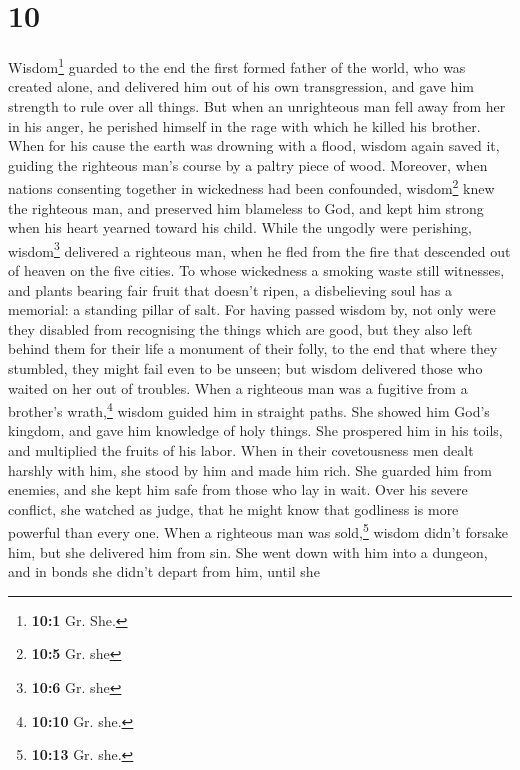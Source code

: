 \hypertarget{section-9}{%
\section{10}\label{section-9}}

 Wisdom\footnote{\textbf{10:1} Gr. She.} guarded to the
end the first formed father of the world, who was created alone, and
delivered him out of his own transgression,  and gave him
strength to rule over all things.  But when an unrighteous
man fell away from her in his anger, he perished himself in the rage
with which he killed his brother.  When for his cause the
earth was drowning with a flood, wisdom again saved it, guiding the
righteous man's course by a paltry piece of wood. 
Moreover, when nations consenting together in wickedness had been
confounded, wisdom\footnote{\textbf{10:5} Gr. she} knew the righteous
man, and preserved him blameless to God, and kept him strong when his
heart yearned toward his child.  While the ungodly were
perishing, wisdom\footnote{\textbf{10:6} Gr. she} delivered a righteous
man, when he fled from the fire that descended out of heaven on the five
cities.  To whose wickedness a smoking waste still
witnesses, and plants bearing fair fruit that doesn't ripen, a
disbelieving soul has a memorial: a standing pillar of salt.
 For having passed wisdom by, not only were they disabled
from recognising the things which are good, but they also left behind
them for their life a monument of their folly, to the end that where
they stumbled, they might fail even to be unseen;  but
wisdom delivered those who waited on her out of troubles.
 When a righteous man was a fugitive from a brother's
wrath,\footnote{\textbf{10:10} Gr. she.} wisdom guided him in straight
paths. She showed him God's kingdom, and gave him knowledge of holy
things. She prospered him in his toils, and multiplied the fruits of his
labor.  When in their covetousness men dealt harshly with
him, she stood by him and made him rich.  She guarded him
from enemies, and she kept him safe from those who lay in wait. Over his
severe conflict, she watched as judge, that he might know that godliness
is more powerful than every one.  When a righteous man
was sold,\footnote{\textbf{10:13} Gr. she.} wisdom didn't forsake him,
but she delivered him from sin. She went down with him into a dungeon,
 and in bonds she didn't depart from him, until she
